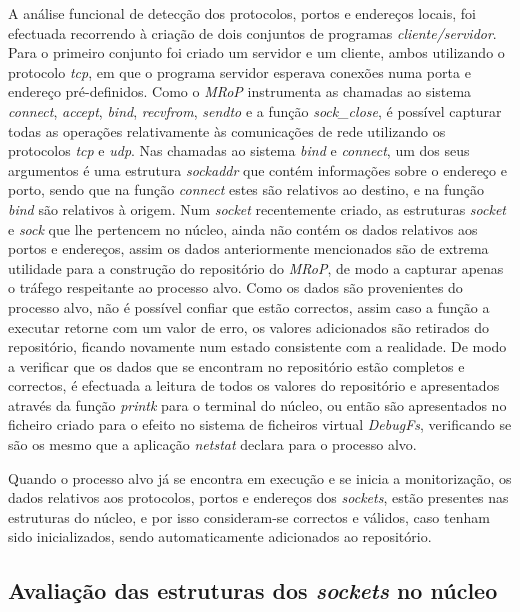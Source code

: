 A análise funcional de detecção dos protocolos, portos e endereços locais, foi efectuada recorrendo à criação de dois conjuntos de programas \textit{cliente/servidor}.
Para o primeiro conjunto foi criado um servidor e um cliente, ambos utilizando o protocolo \textit{tcp}, em que o programa servidor esperava conexões numa porta e endereço pré-definidos.
Como o \textit{MRoP} instrumenta as chamadas ao sistema \textit{connect}, \textit{accept}, \textit{bind}, \textit{recvfrom}, \textit{sendto} e a função \textit{sock\_close}, é possível capturar todas as operações relativamente às comunicações de rede utilizando os protocolos \textit{tcp} e \textit{udp}.
Nas chamadas ao sistema \textit{bind} e \textit{connect}, um dos seus argumentos é uma estrutura \textit{sockaddr} que contém informações sobre o endereço e porto, sendo que na função \textit{connect} estes são relativos ao destino, e na função \textit{bind} são relativos à origem.
Num \textit{socket} recentemente criado, as estruturas \textit{socket} e \textit{sock} que lhe pertencem no núcleo, ainda não contém os dados relativos aos portos e endereços, assim os dados anteriormente mencionados são de extrema utilidade para a construção do repositório do \textit{MRoP}, de modo a capturar apenas o tráfego respeitante ao processo alvo.
Como os dados são provenientes do processo alvo, não é possível confiar que estão correctos, assim caso a função a executar retorne com um valor de erro, os valores adicionados são retirados do repositório, ficando novamente num estado consistente com a realidade.
De modo a verificar que os dados que se encontram no repositório estão completos e correctos, é efectuada a leitura de todos os valores do repositório e apresentados através da função \textit{printk} para o terminal do núcleo, ou então são apresentados no ficheiro criado para o efeito no sistema de ficheiros virtual \textit{DebugFs}, verificando se são os mesmo que a aplicação \textit{netstat} declara para o processo alvo.

Quando o processo alvo já se encontra em execução e se inicia a monitorização, os dados relativos aos protocolos, portos e endereços dos \textit{sockets}, estão presentes nas estruturas do núcleo, e por isso consideram-se correctos e válidos, caso tenham sido inicializados, sendo automaticamente adicionados ao repositório.



\subsection{Avaliação das estruturas dos \textit{sockets} no núcleo}


